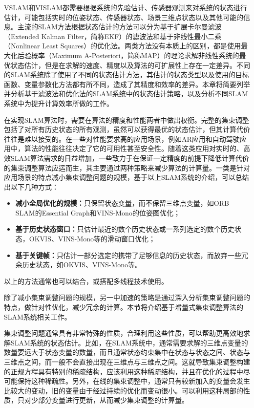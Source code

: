 \documentclass[oneside]{ZJUthesis}
\begin{document}
VSLAM和VISLAM都需要根据系统的先验估计、传感器观测来对系统的状态进行估计，可能包括实时的位姿状态、传感器状态、场景三维点状态以及其他可能的信息。主流的SLAM方法根据状态估计的方法可以分为基于扩展卡尔曼滤波（Extended Kalman Filter，简称EKF）的滤波法和基于非线性最小二乘（Nonlinear Least Squares）的优化法。两类方法没有本质上的区别，都是使用最大化后验概率（Maximum A-Posteriori，简称MAP）的理论求解非线性系统的最优状态估计，但是在求解的速度、精度以及算法的可扩展性上存在一定差异。不同的SLAM系统除了使用了不同的状态估计方法，其估计的状态类型以及使用的目标函数、变量参数化方法都有所不同，造成了其精度和效率的差异。本章将简要列举并分析基于滤波法和优化法的SLAM系统中的状态估计策略，以及分析不同SLAM系统中为提升计算效率所做的工作。

在实现SLAM算法时，需要在算法的精度和性能两者中做出权衡。完整的集束调整包括了对所有历史状态的所有观测，虽然可以获得最优的状态估计，但其计算代价往往是难以接受的。在一些对性能要求高的应用场景，例如AR应用和自动驾驶应用中，算法的性能往往决定了它的可用性甚至安全性。随着这类应用对实时的、高效SLAM算法需求的日益增加，一些致力于在保证一定精度的前提下降低计算代价的集束调整算法应运而生，其主要通过两种策略来减少算法的计算量。一类是针对应用场景的特点减小集束调整问题的规模，基于以上SLAM系统的介绍，可以总结出以下几种方式：
\begin{itemize}
    \item \textbf{减小全局优化的规模：}只保留状态变量，而不保留三维点变量，如ORB-SLAM\citep{mur2015orb,murorb2}的Essential Graph和VINS-Mono\citep{qin2018vins}的位姿图优化；
    \item \textbf{基于历史状态窗口：}只估计最近的数个历史状态或一系列选定的数个历史状态，OKVIS\citep{leutenegger2015keyframe}、VINS-Mono等的滑动窗口优化；
    \item \textbf{基于关键帧：}只估计一部分选定的携带了足够信息的历史状态，而放弃一些冗余历史状态，如OKVIS、VINS-Mono等。
\end{itemize}
以上的方法通常也可以结合，或搭配多线程技术使用。

除了减小集束调整问题的规模，另一中加速的策略是通过深入分析集束调整问题的特点，做针对性优化，减少冗余的计算。本节将介绍基于增量式集束调整算法的SLAM系统相关工作。

集束调整问题通常具有非常特殊的性质，合理利用这些性质，可以帮助更高效地求解SLAM系统的状态估计。比如，在SLAM系统中，通常需要求解的三维点变量的数量要远大于状态变量的数量，而且通常状态约束集中在状态与状态之间、状态与三维点之间，而一般不会直接出现在三维点与三维点之间。这就导致集束调整构建的正规方程具有特别的稀疏结构，应该利用这种稀疏结构，并且在优化的过程中尽可能保持这种稀疏性。另外，在线的集束调整中，通常只有较新加入的变量会发生比较大的变动，旧的变量由于经过持续的优化而变动很小。可以利用这种局部的性质，只对少部分变量进行更新，从而减少集束调整的计算量。
\end{document}
